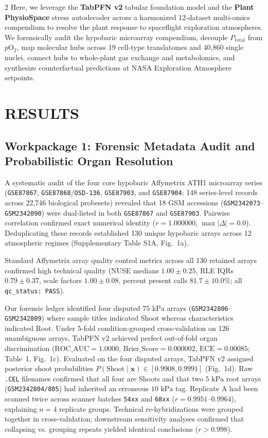 \documentclass[10pt,a4paper]{article}
\begin{document}
\begin{multicols}{2}
Here, we leverage the \textbf{TabPFN v2} tabular foundation model\cite{hollmann2025accurate} and the \textbf{Plant PhysioSpace} stress autodecoder\cite{esfahani2021plant} across a harmonized 12-dataset multi-omics compendium to resolve the plant response to spaceflight exploration atmospheres. We forensically audit the hypobaric microarray compendium, decouple $P_{\text{total}}$ from $p\text{O}_2$, map molecular hubs across 19 cell-type translatomes and 40,860 single nuclei, connect hubs to whole-plant gas exchange and metabolomics, and synthesize counterfactual predictions at NASA Exploration Atmosphere setpoints.

\section*{RESULTS}

\subsection*{Workpackage 1: Forensic Metadata Audit and Probabilistic Organ Resolution}
A systematic audit of the four core hypobaric Affymetrix ATH1 microarray series (\texttt{GSE87867}, \texttt{GSE87868}/\texttt{OSD-136}, \texttt{GSE87903}, and \texttt{GSE87904}; 148 series-level records across 22,746 biological probesets) revealed that 18 GSM accessions (\texttt{GSM2342073}--\texttt{GSM2342090}) were dual-listed in both \texttt{GSE87867} and \texttt{GSE87903}. Pairwise correlation confirmed exact numerical identity ($r = 1.000000$, $\max|\Delta| = 0.0$). Deduplicating these records established 130 unique hypobaric arrays across 12 atmospheric regimes (Supplementary Table S1A, Fig.~1a).

Standard Affymetrix array quality control metrics across all 130 retained arrays confirmed high technical quality (NUSE medians $1.00 \pm 0.25$, RLE IQRs $0.79 \pm 0.37$, scale factors $1.00 \pm 0.08$, percent present calls $81.7 \pm 10.0\%$; all \texttt{qc\_status: PASS}). 

Our forensic ledger identified four disputed $75\text{ kPa}$ arrays (\texttt{GSM2342806}--\texttt{GSM2342809}) where sample titles indicated Shoot whereas characteristics indicated Root. Under 5-fold condition-grouped cross-validation on 126 unambiguous arrays, TabPFN v2 achieved perfect out-of-fold organ discrimination ($\text{ROC\_AUC} = 1.0000$, $\text{Brier\_Score} = 0.000002$, $\text{ECE} = 0.00085$; Table~1, Fig.~1c). Evaluated on the four disputed arrays, TabPFN v2 assigned posterior shoot probabilities $P(\text{Shoot}\mid\mathbf{x}) \in [0.9908, 0.9991]$ (Fig.~1d). Raw \texttt{.CEL} filenames confirmed that all four are Shoots and that two $5\text{ kPa}$ root arrays (\texttt{GSM2342804/805}) had inherited an erroneous $10\text{ kPa}$ tag. Replicate A had been scanned twice across scanner batches \texttt{54xx} and \texttt{68xx} ($r = 0.9951\text{--}0.9964$), explaining $n=4$ replicate groups. Technical re-hybridizations were grouped together in cross-validation; downstream sensitivity analyses confirmed that collapsing vs. grouping repeats yielded identical conclusions ($r > 0.998$).

\end{multicols}
\end{document}
